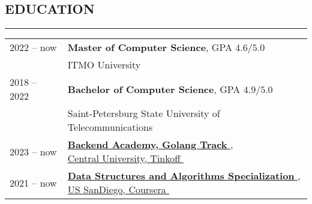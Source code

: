 \documentclass[11pt]{res} %
\let\orighref\href
\renewcommand{\href}[2]{\orighref{#1}{#2\,\faExternalLink}}
\begin{document}
\begin{resume}
        

        \section{\uppercase{Education}}
        \begin{spacing}{0.3}
            \textcolor[RGB]{220,220,220}{\rule{\linewidth}{0.4pt}}
        \end{spacing}
        \begin{tabular}[t]{l l}
            
            2022 -- now & \textbf{Master of Computer Science}, GPA $4.6/5.0$\\
            & ITMO University \\
            2018 -- 2022 & \textbf{Bachelor of Computer Science}, GPA $4.9/5.0$  \\
            & Saint-Petersburg State University of Telecommunications   \\

            2023 -- now & \makecell[l]{\textbf{\href{https://fintech.tinkoff.ru/academy/backend/}{Backend Academy, Golang Track}}, \\
            \href{https://www.coursera.org/specializations/data-structures-algorithms}{Central University, Tinkoff}} \\
            
            2021 -- now & \makecell[l]{\textbf{\href{https://www.coursera.org/specializations/data-structures-algorithms}{Data Structures and Algorithms Specialization}}, \\
            \href{https://www.coursera.org/ucsd}{US SanDiego, Coursera}}
            
        \end{tabular}


    \end{resume}
\end{document}
